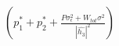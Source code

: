 \documentclass[preview]{standalone}
\begin{document}
\begin{align*}
\left(p_1^\ast + p_2^\ast + \frac{P \sigma_\epsilon^2 + W_{tot} \sigma^2}{\left|\hat{h_3}\right|^2}\right)
\end{align*}
\end{document}
